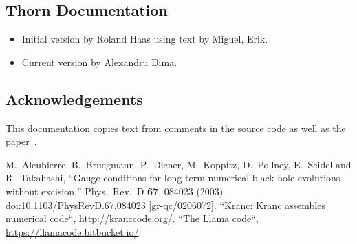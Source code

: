\subsection{Thorn Documentation}
\begin{itemize}
\item Initial version by Roland Haas using text by Miguel, Erik.
\item Current version by Alexandru Dima.
\end{itemize}

\subsection{Acknowledgements}
This documentation copies text from comments in the source code as well
as the paper~\cite{EinsteinEvolve_NewRad_Alcubierre:2002kk}.

\begin{thebibliography}{9}
  M.~Alcubierre, B.~Bruegmann, P.~Diener, M.~Koppitz, D.~Pollney, E.~Seidel and R.~Takahashi,
  ``Gauge conditions for long term numerical black hole evolutions without excision,''
  Phys.\ Rev.\ D {\bf 67}, 084023 (2003)
  doi:10.1103/PhysRevD.67.084023
  [gr-qc/0206072].
 ``Kranc: Kranc assembles
numerical code``, \url{http://kranccode.org/}.
 ``The Llama code``, \url{https://llamacode.bitbucket.io/}.

\end{thebibliography}



